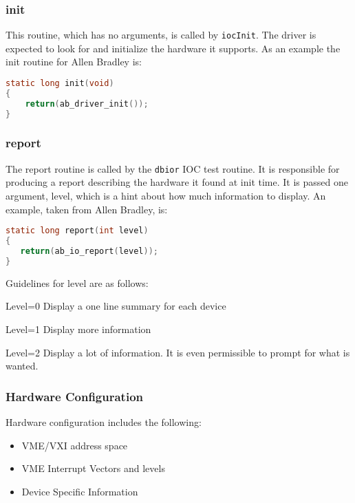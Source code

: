 \subsubsection{init}

This routine, which has no arguments, is called by \verb|iocInit|. The driver is expected to look for and initialize the 
hardware it supports. As an example the init routine for Allen Bradley is:

\begin{lstlisting}[language=C]
static long init(void)
{
    return(ab_driver_init());
}
\end{lstlisting}

\subsubsection{report}

The report routine is called by the \verb|dbior| IOC test routine. It is responsible for producing a report describing the 
hardware it found at init time. It is passed one argument, level, which is a hint about how much information to display. An 
example, taken from Allen Bradley, is:

\begin{lstlisting}[language=C]
static long report(int level)
{
   return(ab_io_report(level));
}
\end{lstlisting}

Guidelines for level are as follows:

\begin{description}
\item Level=0 Display a one line summary for each device

\item Level=1 Display more information

\item Level=2 Display a lot of information. It is even permissible to prompt for what is wanted.

\end{description}

\subsubsection{Hardware Configuration}

Hardware configuration includes the following:

\begin{itemize}
\item VME/VXI address space

\item VME Interrupt Vectors and levels

\item Device Specific Information

\end{itemize}

